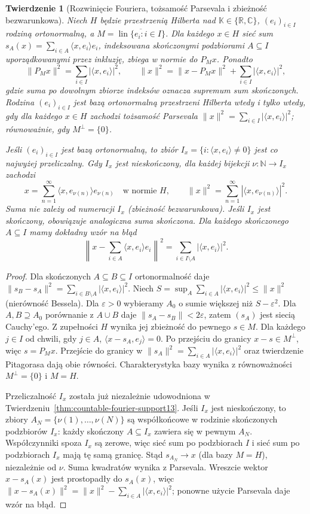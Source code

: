 \documentclass[11pt,a4paper]{article}
\numberwithin{equation}{section}
\theoremstyle{plain}
\newtheorem{twierdzenie}{Twierdzenie}[section]
\theoremstyle{definition}
\theoremstyle{remark}
\newcommand{\R}{\mathbb R}
\newcommand{\C}{\mathbb C}
\newcommand{\N}{\mathbb N}
\newcommand{\K}{\mathbb K}
\DeclareMathOperator{\lin}{lin}
\begin{document}
\begin{twierdzenie}[Rozwinięcie Fouriera, tożsamość Parsevala i zbieżność bezwarunkowa]
\label{thm:parseval13}
\label{cor:fourier-enumeration13}
Niech $H$ będzie przestrzenią Hilberta nad $\K\in\{\R,\C\}$,
$(e_i)_{i\in I}$ rodziną ortonormalną, a
$M=\overline{\lin\{e_i:i\in I\}}$. Dla każdego $x\in H$
sieć sum $s_A(x)=\sum_{i\in A}\langle x,e_i\rangle e_i$,
indeksowana skończonymi podzbiorami $A\subseteq I$ uporządkowanymi
przez inkluzję, zbiega w normie do $P_Mx$. Ponadto
\[
 \|P_Mx\|^2=\sum_{i\in I}|\langle x,e_i\rangle|^2,
 \qquad
 \|x\|^2=\|x-P_Mx\|^2+
               \sum_{i\in I}|\langle x,e_i\rangle|^2,
\]
gdzie suma po dowolnym zbiorze indeksów oznacza supremum
sum skończonych. Rodzina $(e_i)_{i\in I}$ jest bazą ortonormalną
przestrzeni Hilberta wtedy i tylko wtedy, gdy dla każdego $x\in H$
zachodzi tożsamość Parsevala $\|x\|^2=\sum_{i\in I}
|\langle x,e_i\rangle|^2$; równoważnie, gdy
$M^\perp=\{0\}$.

Jeśli $(e_i)_{i\in I}$ jest bazą ortonormalną, to zbiór
$I_x=\{i:\langle x,e_i\rangle\ne0\}$ jest co najwyżej
przeliczalny. Gdy $I_x$ jest nieskończony, dla każdej bijekcji
$\nu:\N\to I_x$ zachodzi
\[
 x=\sum_{n=1}^{\infty}\langle x,e_{\nu(n)}\rangle e_{\nu(n)}
 \quad\text{w normie $H$},\qquad
 \|x\|^2=\sum_{n=1}^{\infty}|\langle x,e_{\nu(n)}\rangle|^2.
\]
Suma nie zależy od numeracji $I_x$ (zbieżność bezwarunkowa).
Jeśli $I_x$ jest skończony, obowiązuje analogiczna suma skończona.
Dla każdego skończonego $A\subseteq I$ mamy dokładny wzór na błąd
\[
 \left\|x-\sum_{i\in A}\langle x,e_i\rangle e_i\right\|^2
 =\sum_{i\in I\setminus A}|\langle x,e_i\rangle|^2.
\]
\end{twierdzenie}
\begin{proof}
Dla skończonych $A\subseteq B\subseteq I$ ortonormalność daje
$\|s_B-s_A\|^2=\sum_{i\in B\setminus A}|\langle x,e_i\rangle|^2$.
Niech $S=\sup_A\sum_{i\in A}|\langle x,e_i\rangle|^2
\le\|x\|^2$ (nierówność Bessela). Dla $\varepsilon>0$ wybieramy
$A_0$ o sumie większej niż $S-\varepsilon^2$.
Dla $A,B\supseteq A_0$ porównanie z $A\cup B$ daje
$\|s_A-s_B\|<2\varepsilon$, zatem $(s_A)$ jest siecią
Cauchy'ego. Z zupełności $H$ wynika jej zbieżność do pewnego
$s\in M$. Dla każdego $j\in I$ od chwili, gdy $j\in A$,
$\langle x-s_A,e_j\rangle=0$. Po przejściu do granicy
$x-s\in M^\perp$, więc $s=P_Mx$. Przejście do granicy
w $\|s_A\|^2=\sum_{i\in A}|\langle x,e_i\rangle|^2$
oraz twierdzenie Pitagorasa dają obie równości.
Charakterystyka bazy wynika z równoważności $M^\perp=\{0\}$
i $M=H$.

Przeliczalność $I_x$ została już niezależnie udowodniona
w Twierdzeniu~\ref{thm:countable-fourier-support13}.
Jeśli $I_x$ jest nieskończony, to zbiory
$A_N=\{\nu(1),\ldots,\nu(N)\}$ są współkońcowe w rodzinie
skończonych podzbiorów $I_x$: każdy skończony
$A\subseteq I_x$ zawiera się w pewnym $A_N$. Współczynniki
spoza $I_x$ są zerowe, więc sieć sum po podzbiorach $I$ i
sieć sum po podzbiorach $I_x$ mają tę samą granicę.
Stąd $s_{A_N}\to x$ (dla bazy $M=H$), niezależnie od $\nu$.
Suma kwadratów wynika z Parsevala. Wreszcie wektor
$x-s_A(x)$ jest prostopadły do $s_A(x)$, więc
$\|x-s_A(x)\|^2=\|x\|^2-\sum_{i\in A}|\langle x,e_i\rangle|^2$;
ponowne użycie Parsevala daje wzór na błąd.
\end{proof}
\end{document}
